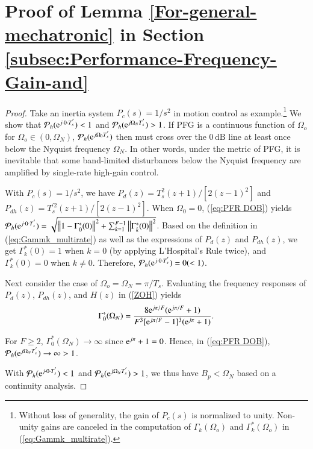 \documentclass [11pt, proquest] {uwthesis}[2020/02/24]
\begin{document}
\section{Proof of Lemma \mbox{\ref{For-general-mechatronic}} in Section \ref{subsec:Performance-Frequency-Gain-and}} \label{chapA:Proof-of-Lemma-5}
\begin{proof}
Take an inertia system $P_{c}(s)=1/s^{2}$ in motion control as example.\footnote{Without loss of generality, the gain of $P_{c}(s)$ is normalized
to unity. Non-unity gains are canceled in the computation of $\Gamma_{k}(\Omega_{o})$
and $\Gamma_{k}^{*}(\Omega_{o})$ in (\ref{eq:Gammk_multirate}).} We show that $\mathcal{P}_{h}(\mathrm{e}^{j\cdot0\cdot T_{s}^{'}})<1$ and
$\mathcal{P}_{h}(\mathrm{e}^{j\Omega_{N}T_{s}^{'}})>1$. If PFG is a continuous
function of $\Omega_{o}$ for $\Omega_{o}\in(0,\Omega_{N})$, $\mathcal{P}_{h}(\mathrm{e}^{j\Omega_{0}T_{s}^{'}})$
then must cross over the $0\,\text{dB}$ line at least once below
the Nyquist frequency $\Omega_{N}$. In other words, under the metric
of PFG, it is inevitable that some band-limited disturbances below
the Nyquist frequency are amplified by single-rate high-gain control.

With $P_{c}(s)=1/s^{2}$, we have $P_{d}(z)=T_{s}^{2}(z+1)/\left[2(z-1)^{2}\right]$
and $P_{dh}(z)=T_{s}^{'2}(z+1)/\left[2(z-1)^{2}\right]$. When $\Omega_{0}=0$,
(\ref{eq:PFR DOB}) yields $\mathcal{P}_{h}(\mathrm{e}^{j\cdot0\cdot T_{s}^{'}})=\sqrt{\left\Vert 1-\Gamma_{0}^{*}(0)\right\Vert ^{2}+\sum_{k=1}^{F-1}\left\Vert \Gamma_{k}^{*}(0)\right\Vert ^{2}}$.
Based on the definition in (\ref{eq:Gammk_multirate}) as well as
the expressions of $P_{d}(z)$ and $P_{dh}(z)$, we get $\Gamma_{k}^{*}(0)=1$
when $k=0$ (by applying L\textquoteright Hospital\textquoteright s
Rule twice), and $\Gamma_{k}^{*}(0)=0$ when $k\neq0$. Therefore,
$\mathcal{P}_{h}(\mathrm{e}^{j\cdot0\cdot T_{s}^{'}})=0(<1)$. 

Next consider the case of $\Omega_{o}=\Omega_{N}=\pi/T_{s}$. Evaluating
the frequency responses of $P_{d}(z)$, $P_{dh}(z)$, and $H(z)$
in (\ref{ZOH}) yields
\begin{equation}
\Gamma_{0}^{*}(\Omega_{N})=\frac{8\mathrm{e}^{j\pi/F}(\mathrm{e}^{j\pi/F}+1)}{F^{3}[\mathrm{e}^{j\pi/F}-1]^{3}(\mathrm{e}^{j\pi}+1)}.\label{eq:gammak_omegaN}
\end{equation}

For $F\geqslant2$, $\Gamma_{0}^{*}(\Omega_{N})\rightarrow\infty$
since $\mathrm{e}^{j\pi}+1=0$. Hence, in (\ref{eq:PFR DOB}), $\mathcal{P}_{h}(\mathrm{e}^{j\Omega_{N}T_{s}^{'}})\rightarrow\infty>1$.

With $\mathcal{P}_{h}(\mathrm{e}^{j\cdot0\cdot T_{s}^{'}})<1$ and $\mathcal{P}_{h}(\mathrm{e}^{j\Omega_{N}T_{s}^{'}})>1$,
we thus have $B_{p}<\Omega_{N}$ based on a continuity analysis. %

\end{proof}
\end{document}
